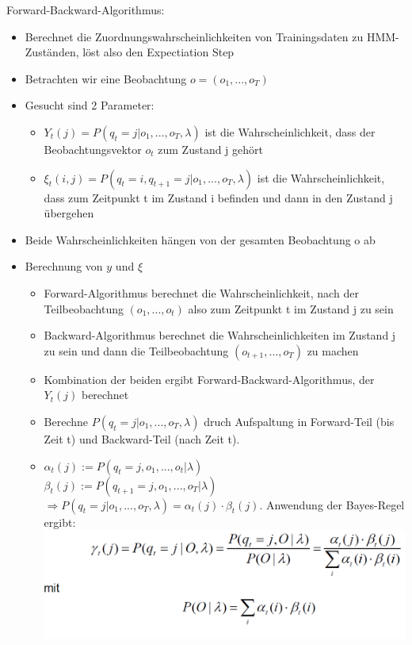 \documentclass[a4paper,10pt,oneside]{article}
\begin{document}
Forward-Backward-Algorithmus:
	\begin{itemize}
		\item Berechnet die Zuordnungswahrscheinlichkeiten von Trainingsdaten zu HMM-Zuständen, löst also den Expectiation Step
		\item Betrachten wir eine Beobachtung $o=(o_1,...,o_T)$
		\item Gesucht sind 2 Parameter:
			\begin{itemize}
				\item $Y_t(j) = P (q_t=j|o_1,...,o_T,\lambda)$ ist die Wahrscheinlichkeit, dass der Beobachtungsvektor $o_t$ zum Zustand j gehört
				\item $\xi_t(i,j) = P (q_t=i,q_{t+1}=j | o_1,...,o_T,\lambda)$ ist die Wahrscheinlichkeit, dass zum Zeitpunkt t im Zustand i befinden und dann in den Zustand j übergehen
			\end{itemize}
		\item Beide Wahrscheinlichkeiten hängen von der gesamten Beobachtung o ab
		\item Berechnung von $y$ und $\xi$
			\begin{itemize}
				\item Forward-Algorithmus berechnet die Wahrscheinlichkeit, nach der Teilbeobachtung $(o_1,...,o_t)$ also zum Zeitpunkt t im Zustand j zu sein
				\item Backward-Algorithmus berechnet die Wahrscheinlichkeiten im Zustand j zu sein und dann die Teilbeobachtung $(o_{t+1},...,o_T)$ zu machen
				\item Kombination der beiden ergibt Forward-Backward-Algorithmus, der $Y_t(j)$ berechnet
				\item Berechne $P(q_t=j|o_1,...,o_T,\lambda)$ druch Aufspaltung in Forward-Teil (bis Zeit t) und Backward-Teil (nach Zeit t).
				\item $\alpha_t(j) := P(q_t=j,o_1,...,o_t|\lambda)$ \\
					  $\beta_t(j) := P(q_{t+1}=j,o_1,...,o_T|\lambda)$ \\
					  $\Rightarrow P(q_t=j|o_1,...,o_T,\lambda) = \alpha_t(j) \cdot  \beta_t(j)$. Anwendung der Bayes-Regel ergibt: \\ \vspace{3px}
				\includegraphics[scale=0.2]{Grafiken/forward-backward-algo.png}	  	

\end{itemize}
\end{itemize}
\end{document}
